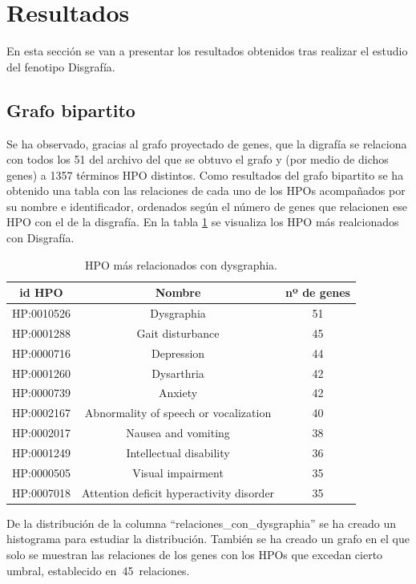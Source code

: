
\section{Resultados}

En esta sección se van a presentar los resultados obtenidos tras realizar el estudio del fenotipo Disgrafía.

\subsection{Grafo bipartito}

Se ha observado, gracias al grafo proyectado de genes, que la digrafía se relaciona con todos los 51 del archivo del que se obtuvo el grafo y (por medio de dichos genes) a 1357 términos HPO distintos. Como resultados del grafo bipartito se ha obtenido una tabla con las relaciones de cada uno de los HPOs acompañados por su nombre e identificador, ordenados según el número de genes que relacionen ese HPO con el de la disgrafía. En la tabla \ref{tab:dysgraphia-relaciones} se visualiza los HPO más realcionados con Disgrafía.

\begin{table}[h]
	\caption{HPO más relacionados con dysgraphia.}
	\label{tab:dysgraphia-relaciones}
	\centering
	\begin{tabular}{|c|c|c|}
		\hline
		\textbf{id HPO} & \textbf{Nombre} & \textbf{nº de genes} \\
		\hline
		HP:0010526 & Dysgraphia & 51 \\
		HP:0001288 & Gait disturbance & 45 \\
		HP:0000716 & Depression & 44 \\
		HP:0001260 & Dysarthria & 42 \\
		HP:0000739 & Anxiety & 42 \\
		HP:0002167 & Abnormality of speech or vocalization & 40 \\
		HP:0002017 & Nausea and vomiting & 38 \\
		HP:0001249 & Intellectual disability & 36 \\
		HP:0000505 & Visual impairment & 35 \\
		HP:0007018 & Attention deficit hyperactivity disorder & 35 \\
		\hline
	\end{tabular}

\end{table}

 
De la distribución de la columna “relaciones\_con\_dysgraphia” se ha creado un histograma para estudiar la distribución. También se ha creado un grafo en el que solo se muestran las relaciones de los genes con los HPOs que excedan cierto umbral, establecido en 45 relaciones.

